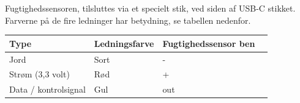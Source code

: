 \documentclass{ucph-handout}
\newcounter{handout}
\newcommand{\Ark}{Arbejdsark \arabic{handout}: }
\renewcommand{\Title}{\Ark LED-strip}%
\begin{document}
\newpage
{}
\renewcommand{\Title}{\Ark Fugtighedssensor}
\begin{exercisebox}[adjusted title=Tilslut fugtighedssensor]
  Fugtighedssensoren, tilsluttes via et specielt stik, ved siden af
  USB-C stikket. Farverne på de fire ledninger har betydning, se tabellen
  nedenfor.

\begin{center}
\begin{minipage}{0.85\linewidth}
\begin{tabular}{llll}
  \textbf{Type} & \textbf{Ledningsfarve} & \textbf{Fugtighedssensor ben} \\
  \hline
 Jord & Sort & - \\
 Strøm (3,3 volt) & Rød & + \\
 Data / kontrolsignal & Gul & out
\end{tabular}
\end{minipage}
\begin{minipage}{0.1\linewidth}

\end{minipage}
\end{center}
\end{exercisebox}
\end{document}
